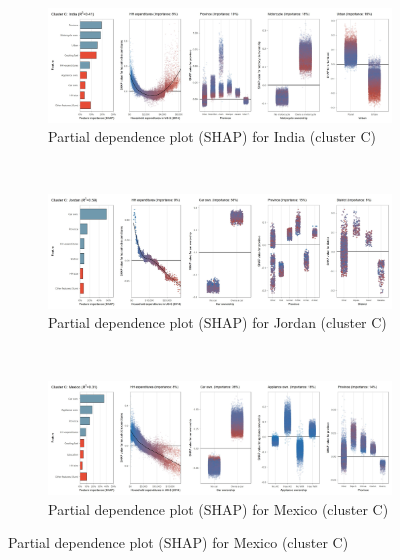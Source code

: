 \begin{figure}[ht!]\ContinuedFloat
    \centering
   \begin{subfigure}[b]{\textwidth}
    \centering
         \caption{Partial dependence plot (SHAP) for India (cluster C)}
         \label{fig:5b_IND}
         \includegraphics[width=\textwidth]{Figure 5b/Figure_5b_IND}    
    \end{subfigure}
    \\
    \vspace{0.5cm}
   \begin{subfigure}[b]{\textwidth}  
   \centering
         \caption{Partial dependence plot (SHAP) for Jordan (cluster C)}
         \label{fig:5b_JOR}
         \includegraphics[width=\textwidth]{Figure 5b/Figure_5b_JOR}
    \end{subfigure}
    \\
    \vspace{0.5cm}
   \begin{subfigure}[b]{\textwidth}
    \centering
         \caption{Partial dependence plot (SHAP) for Mexico (cluster C)}
         \label{fig:5b_MEX}
         \includegraphics[width=\textwidth]{Figure 5b/Figure_5b_MEX}
         \end{subfigure}

\end{figure}
